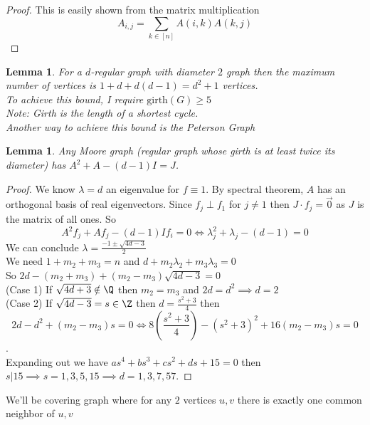 \documentclass[a4paper]{article}
\newtheorem{lem}[thm]{Lemma}
\begin{document}
\begin{proof}
    This is easily shown from the matrix multiplication $$A_{i,j}=\sum_{k\in [n]}A(i,k)A(k,j)$$
\end{proof}
\begin{lem}
    For a $d$-regular graph with diameter $2$ graph then the maximum number of vertices is $1+d+d(d-1)=d^2+1$ vertices.\\
    To achieve this bound, I require $\text{girth}(G)\geq 5$ \\
    Note: Girth is the length of a shortest cycle. \\
    Another way to achieve this bound is the Peterson Graph 
\end{lem}
\begin{lem}
    Any Moore graph (regular graph whose girth is at least twice its diameter) has $A^2+A-(d-1)I=J$. 
\end{lem}
\begin{proof}
    We know $\lambda=d$ an eigenvalue for $f\equiv 1$. By spectral theorem, $A$ has an orthogonal basis of real eigenvectors. Since $f_j\perp f_1$ for $j\neq 1$ then $J\cdot f_j=\Vec{0}$ as $J$ is the matrix of all ones. So $$A^2f_j+Af_j-(d-1)If_i=0\iff \lambda_j^2+\lambda_j-(d-1)=0$$
    We can conclude $\lambda=\frac{-1\pm\sqrt{4d-3}}{2}$\\
    We need $1+m_2+m_3=n$ and $d+m_2\lambda_2+m_3\lambda_3=0$\\
    So $2d-(m_2+m_3)+(m_2-m_3)\sqrt{4d-3}=0$\\
    (Case 1) If $\sqrt{4d+3}\notin \Q$ then $m_2=m_3$ and $2d=d^2\implies d=2$ \\
    (Case 2) If $\sqrt{4d-3}=s\in \Z$ then $d=\frac{s^2+3}{4}$ then $$2d-d^2+(m_2-m_3)s=0\iff 8\left (\frac{s^2+3}{4} \right)-(s^2+3)^2+16(m_2-m_3)s=0$$.\\
    Expanding out we have $as^4+bs^3+cs^2+ds+15=0$ then $s|15\implies s=1,3,5,15\implies d=1,3,7,57.$ 
\end{proof}
\noindent We'll be covering graph where for any $2$ vertices $u,v$ there is exactly one common neighbor of $u,v$\\
\end{document}
